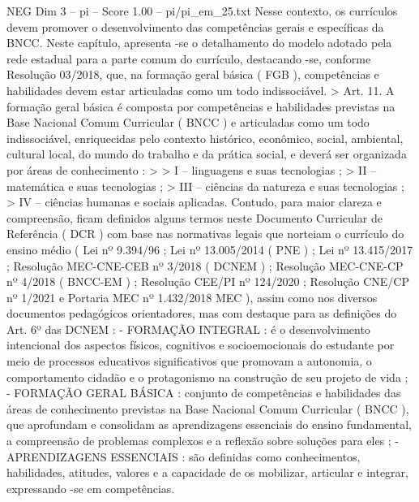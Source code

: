 \begin{textsample}{NEG Dim 3 – pi – Score 1.00 – pi/pi\_em\_25.txt}
Nesse contexto, os currículos devem promover o desenvolvimento das competências gerais e específicas da BNCC.
Neste capítulo, apresenta -se o detalhamento do modelo adotado pela rede estadual para a parte comum do currículo, destacando -se, conforme Resolução 03/2018, que, na formação geral básica ( FGB ), competências e habilidades devem estar articuladas como um todo indissociável. > Art. 11.
A formação geral básica é composta por competências e habilidades previstas na Base Nacional Comum Curricular ( BNCC ) e articuladas como um todo indissociável, enriquecidas pelo contexto histórico, econômico, social, ambiental, cultural local, do mundo do trabalho e da prática social, e deverá ser organizada por áreas de conhecimento : > > I – linguagens e suas tecnologias ; > II – matemática e suas tecnologias ; > III – ciências da natureza e suas tecnologias ; > IV – ciências humanas e sociais aplicadas.
Contudo, para maior clareza e compreensão, ficam definidos alguns termos neste Documento Curricular de Referência ( DCR ) com base nas normativas legais que norteiam o currículo do ensino médio ( Lei nº 9.394/96 ; Lei nº 13.005/2014 ( PNE ) ; Lei nº 13.415/2017 ; Resolução MEC-CNE-CEB nº 3/2018 ( DCNEM ) ; Resolução MEC-CNE-CP nº 4/2018 ( BNCC-EM ) ; Resolução CEE/PI nº 124/2020 ; Resolução CNE/CP nº 1/2021 e Portaria MEC nº 1.432/2018 MEC ), assim como nos diversos documentos pedagógicos orientadores, mas com destaque para as definições do Art. 6º das DCNEM : - FORMAÇÃO INTEGRAL : é o desenvolvimento intencional dos aspectos físicos, cognitivos e socioemocionais do estudante por meio de processos educativos significativos que promovam a autonomia, o comportamento cidadão e o protagonismo na construção de seu projeto de vida ; - FORMAÇÃO GERAL BÁSICA : conjunto de competências e habilidades das áreas de conhecimento previstas na Base Nacional Comum Curricular ( BNCC ), que aprofundam e consolidam as aprendizagens essenciais do ensino fundamental, a compreensão de problemas complexos e a reflexão sobre soluções para eles ; - APRENDIZAGENS ESSENCIAIS : são definidas como conhecimentos, habilidades, atitudes, valores e a capacidade de os mobilizar, articular e integrar, expressando -se em competências.

\end{textsample}
